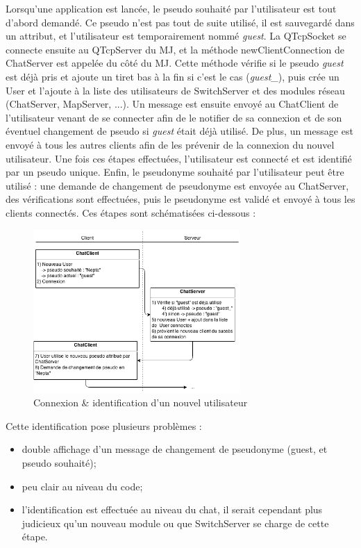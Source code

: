 Lorsqu'une application est lancée, le pseudo souhaité par l'utilisateur est tout d'abord demandé. Ce pseudo n'est pas tout de suite utilisé, il est sauvegardé dans un attribut, et l'utilisateur est temporairement nommé \emph{guest}. La QTcpSocket se connecte ensuite au QTcpServer du MJ, et la méthode newClientConnection de ChatServer est appelée du côté du MJ. Cette méthode vérifie si le pseudo \emph{guest} est déjà pris et ajoute un tiret bas à la fin si c'est le cas (\emph{guest\_}), puis crée un User et l'ajoute à la liste des utilisateurs de SwitchServer et des modules réseau (ChatServer, MapServer, ...). Un message est ensuite envoyé au ChatClient de l'utilisateur venant de se connecter afin de le notifier de sa connexion et de son éventuel changement de pseudo si \emph{guest} était déjà utilisé. De plus, un message est envoyé à tous les autres clients afin de les prévenir de la connexion du nouvel utilisateur. Une fois ces étapes effectuées, l'utilisateur est connecté et est identifié par un pseudo unique. Enfin, le pseudonyme souhaité par l'utilisateur peut être utilisé : une demande de changement de pseudonyme est envoyée au ChatServer, des vérifications sont effectuées, puis le pseudonyme est validé et envoyé à tous les clients connectés. Ces étapes sont schématisées ci-dessous :

\begin{figure}[h!]
	\centering
	\includegraphics[width=0.7\textwidth]{img/chat_connection.png}
	\caption{Connexion \& identification d'un nouvel utilisateur}
\end{figure}

Cette identification pose plusieurs problèmes :
\begin{itemize}
	\item double affichage d'un message de changement de pseudonyme (guest, et pseudo souhaité);
	\item peu clair au niveau du code;
	\item l'identification est effectuée au niveau du chat, il serait cependant plus judicieux qu'un nouveau module ou que SwitchServer se charge de cette étape.
\end{itemize}

